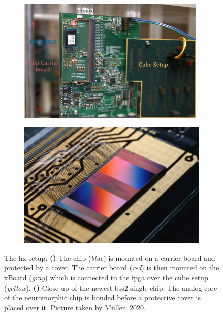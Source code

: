 \begin{figure}[hb!]
	\begin{subfigure}{0.49\textwidth}
		\centering
		\caption{}
		\includegraphics[width=0.98\textwidth]{figures/hxsetup_img_close_edited2.pdf}
		\label{cubesetup}
	\end{subfigure}	
	\begin{subfigure}{0.49\textwidth}
		\centering
		\caption{}
		\includegraphics[width=.98\textwidth]{figures/HXcloseup.JPG}
		\label{hxcloseup}
	\end{subfigure}
	\centering
	\caption[The \acrshort{hx} setup.]{The \acrshort{hx} setup. \textbf{()} The chip (\textit{blue}) is mounted on a carrier board and protected by a cover. The carrier board (\textit{red}) is then mounted on the xBoard (\textit{gray}) which is connected to the \acrshort{fpga} over the cube setup (\textit{yellow}). \textbf{()} Close-up of the newest \gls{bss2} single chip. The analog core of the neuromorphic chip is bonded before a protective cover is placed over it. Picture taken by M{\"u}ller, 2020.} 
	\label{hxsetup}
\end{figure}

